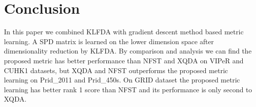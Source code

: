 \documentclass[conference,compsoc]{IEEEtran}
\begin{document}
\section{Conclusion}
In this paper we combined KLFDA with gradient descent method based metric learning. A SPD matrix is learned on the lower dimension space after dimensionality reduction by KLFDA. By comparison and analysis we can find the proposed metric has better performance than NFST and XQDA on VIPeR and CUHK1 datasets, but XQDA and NFST outperforms the proposed metric learning on Prid\_2011 and Prid\_450s. On GRID dataset the proposed metric learning has better rank 1 score than NFST and its performance is only second to XQDA.


%
%
%






%
%
%





\end{document}
